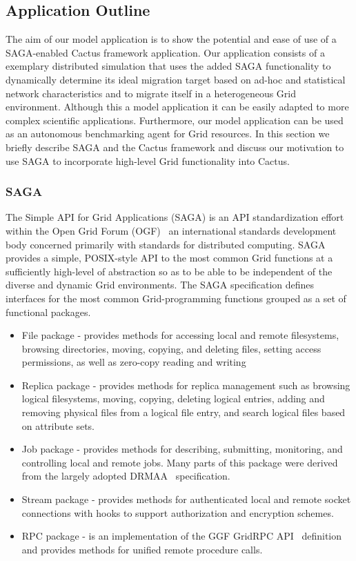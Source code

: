 \documentclass[conference,final]{IEEEtran}
\begin{document}
\subsection{Application Outline}

The aim of our model application is to show the potential and ease of
use of a SAGA-enabled Cactus framework application. Our application
consists of a exemplary distributed simulation that uses the added
SAGA functionality to dynamically determine its ideal migration target
based on ad-hoc and statistical network characteristics and to migrate
itself in a heterogeneous Grid environment.  Although this a model
application it can be easily adapted to more complex scientific
applications.  Furthermore, our model application can be used as an
autonomous benchmarking agent for Grid resources. In this section we
briefly describe SAGA and the Cactus framework and discuss our
motivation to use SAGA to incorporate high-level Grid functionality
into Cactus.

\subsubsection{SAGA}

The Simple API for Grid Applications (SAGA) is an API standardization
effort within the Open Grid Forum (OGF)~\cite{ogf_web} an
international standards development body concerned primarily with
standards for distributed computing.  SAGA provides a simple,
POSIX-style API to the most common Grid functions at a sufficiently
high-level of abstraction so as to be able to be independent of the
diverse and dynamic Grid environments. The SAGA specification defines
interfaces for the most common Grid-programming functions grouped as a
set of functional packages.

\begin{itemize}
\item File package - provides methods for accessing local and remote
  filesystems, browsing directories, moving, copying, and deleting
  files, setting access permissions, as well as zero-copy reading and
  writing
\item Replica package - provides methods for replica management such
  as browsing logical filesystems, moving, copying, deleting logical
  entries, adding and removing physical files from a logical file
  entry, and search logical files based on attribute sets.
\item Job package - provides methods for describing, submitting,
  monitoring, and controlling local and remote jobs. Many parts of
  this package were derived from the largely adopted
  DRMAA~\cite{drmaa_url} specification.
\item Stream package - provides methods for authenticated local and
  remote socket connections with hooks to support authorization and
  encryption schemes.
\item RPC package - is an implementation of the GGF GridRPC
  API~\cite{gridrpc_url} definition and provides methods for unified
  remote procedure calls.
\end{itemize}
\end{document}
